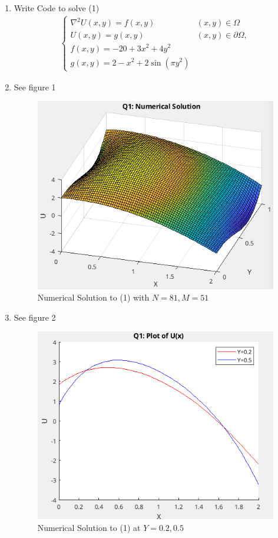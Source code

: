 \documentclass{article}
\begin{document}
\begin{enumerate}[label=\alph*)]

    \item Write Code to solve (1)
    \begin{align}
        \begin{cases}
            \nabla^2 U(x,y) = f(x,y) \quad &(x, y) \in \Omega\\
            U(x,y) = g(x,y) \quad &(x,y) \in \partial\Omega,\\
            f(x,y) = -20 +3x^2 + 4y^2\\
            g(x,y) = 2 - x^2 + 2\sin(\pi y^2)
        \end{cases} 
    \end{align}

    \item See figure 1
    \begin{figure}[ht]
        \centering
        \includegraphics[width=.6\textwidth]{q1_num_sol2.png}
        \caption{Numerical Solution to (1) with $N=81, M=51$}
    \end{figure}

    \item See figure 2
    \begin{figure}[ht]
        \centering
        \includegraphics[width=.6\textwidth]{q1_num_sol_yconst2.png}
        \caption{Numerical Solution to (1) at $Y=0.2, 0.5$}
    \end{figure}

\end{enumerate}
\end{document}

